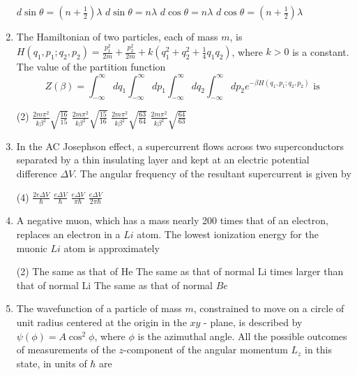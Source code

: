 \begin{enumerate}
\begin{tasks}
	\task[\textbf{a.}] $d \sin \theta=\left(n+\frac{1}{2}\right) \lambda$
	\task[\textbf{b.}]$d \sin \theta=n \lambda$
	\task[\textbf{c.}]$d \cos \theta=n \lambda$
	\task[\textbf{d.}]  $d \cos \theta=\left(n+\frac{1}{2}\right) \lambda$
\end{tasks}
\item The Hamiltonian of two particles, each of mass $m$, is $H\left(q_{1}, p_{1} ; q_{2}, p_{2}\right)=\frac{p_{1}^{2}}{2 m}+\frac{p_{2}^{2}}{2 m}+k\left(q_{1}^{2}+q_{2}^{2}+\frac{1}{4} q_{1} q_{2}\right)$, where $k>0$ is a constant. The value of the partition function
$$
Z(\beta)=\int_{-\infty}^{\infty} d q_{1} \int_{-\infty}^{\infty} d p_{1} \int_{-\infty}^{\infty} d q_{2} \int_{-\infty}^{\infty} d p_{2} e^{-\beta H\left(q_{1}, p_{1} ; q_{2}, p_{2}\right)} \text { is }
$$
 \begin{tasks}(2)
	\task[\textbf{a.}] $\frac{2 m \pi^{2}}{k \beta^{2}} \sqrt{\frac{16}{15}}$
	\task[\textbf{b.}]$\frac{2 m \pi^{2}}{k \beta^{2}} \sqrt{\frac{15}{16}}$
	\task[\textbf{c.}]$\frac{2 m \pi^{2}}{k \beta^{2}} \sqrt{\frac{63}{64}}$
	\task[\textbf{d.}]  $\frac{2 m \pi^{2}}{k \beta^{2}} \sqrt{\frac{64}{63}}$
\end{tasks}
\item In the AC Josephson effect, a supercurrent flows across two superconductors separated by a thin insulating layer and kept at an electric potential difference $\Delta V$. The angular frequency of the resultant supercurrent is given by
 \begin{tasks}(4)
	\task[\textbf{a.}] $\frac{2 e \Delta V}{\hbar}$
	\task[\textbf{b.}]$\frac{e \Delta V}{\hbar}$
	\task[\textbf{c.}]$\frac{e \Delta V}{\pi \hbar}$
	\task[\textbf{d.}] $\frac{e \Delta V}{2 \pi \hbar}$
\end{tasks}
\item A negative muon, which has a mass nearly 200 times that of an electron, replaces an electron in a $L i$ atom. The lowest ionization energy for the muonic $L i$ atom is approximately
 \begin{tasks}(2)
	\task[\textbf{a.}]The same as that of He
	\task[\textbf{b.}] The same as that of normal $\mathrm{Li}$
	 times larger than that of normal $\mathrm{Li}$
	\task[\textbf{d.}] The same as that of normal $B e$
\end{tasks}
\item The wavefunction of a particle of mass $m$, constrained to move on a circle of unit radius centered at the origin in the $x y$ - plane, is described by $\psi(\phi)=A \cos ^{2} \phi$, where $\phi$ is the azimuthal angle. All the possible outcomes of measurements of the $z$-component of the angular momentum $L_{z}$ in this state, in units of $\hbar$ are

\end{enumerate}
